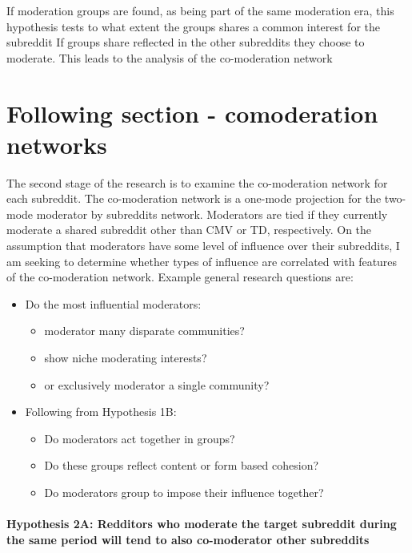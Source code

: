\documentclass[11pt]{article}
\providecommand{\tightlist}{%
      \setlength{\itemsep}{0pt}\setlength{\parskip}{0pt}}
\begin{document}
If moderation groups are found, as being part of the same moderation
era, this hypothesis tests to what extent the groups shares a common
interest for the subreddit If groups share reflected in the other
subreddits they choose to moderate. This leads to the analysis of the
co-moderation network

\section{Following section - comoderation
networks}\label{following-section---comoderation-networks}

The second stage of the research is to examine the co-moderation network
for each subreddit. The co-moderation network is a one-mode projection
for the two-mode moderator by subreddits network. Moderators are tied if
they currently moderate a shared subreddit other than CMV or TD,
respectively. On the assumption that moderators have some level of
influence over their subreddits, I am seeking to determine whether types
of influence are correlated with features of the co-moderation network.
Example general research questions are:

\begin{itemize}
\tightlist
\item
  Do the most influential moderators:

  \begin{itemize}
  \tightlist
  \item
    moderator many disparate communities?
  \item
    show niche moderating interests?
  \item
    or exclusively moderator a single community?
  \end{itemize}
\item
  Following from Hypothesis 1B:

  \begin{itemize}
  \tightlist
  \item
    Do moderators act together in groups?
  \item
    Do these groups reflect content or form based cohesion?
  \item
    Do moderators group to impose their influence together?
  \end{itemize}
\end{itemize}

\paragraph{Hypothesis 2A: Redditors who moderate the target subreddit
during the same period will tend to also co-moderator other
subreddits}\label{hypothesis-2a-redditors-who-moderate-the-target-subreddit-during-the-same-period-will-tend-to-also-co-moderator-other-subreddits}
\end{document}

